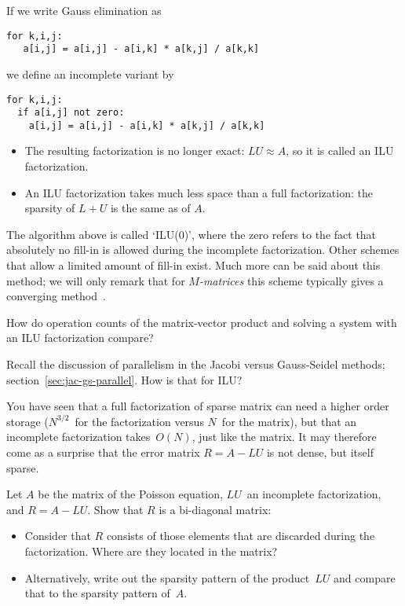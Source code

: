 If we write Gauss elimination as
\begin{verbatim}
for k,i,j:
   a[i,j] = a[i,j] - a[i,k] * a[k,j] / a[k,k]
\end{verbatim}
we define an incomplete variant by
\begin{verbatim}
for k,i,j:
  if a[i,j] not zero:
    a[i,j] = a[i,j] - a[i,k] * a[k,j] / a[k,k]
\end{verbatim}
\begin{itemize}
\item The resulting factorization is no longer exact: $LU\approx A$,
  so it is called an \acf{ILU} factorization.
\item An \ac{ILU} factorization takes much less space than a full
  factorization: the sparsity of $L+U$ is the same as of $A$.
\end{itemize}
The algorithm above is called `ILU(0)', where the zero refers to the
fact that absolutely no fill-in is allowed during the incomplete
factorization.  Other schemes that allow a limited amount of fill-in
exist.  Much more can be said about this method; we will only remark
that for \emph{$M$-matrices}
this scheme typically gives a converging
method~\cite{MevdVo:itsol}.

\begin{exercise}
  How do operation counts of the matrix-vector product and solving a
  system with an \ac{ILU} factorization compare?

  Recall the discussion of parallelism in the Jacobi versus Gauss-Seidel methods;
  section~\ref{sec:jac-gs-parallel}.
  How is that for \ac{ILU}?
\end{exercise}

You have seen that a full factorization of sparse matrix can need a
higher order storage ($N^{3/2}$~for the factorization versus $N$~for
the matrix), but that an incomplete factorization takes~$O(N)$, just
like the matrix. It may therefore come as a surprise that the error
matrix $R=A-LU$ is not dense, but itself sparse.
\begin{exercise}
  Let $A$ be the matrix of the Poisson equation, $LU$~an incomplete
  factorization, and $R=A-LU$. Show that $R$ is a bi-diagonal matrix:
  \begin{itemize}
  \item Consider that $R$ consists of those elements that are
    discarded during the factorization. Where are they located in the
    matrix?
  \item Alternatively, write out the sparsity pattern of the
    product~$LU$ and compare that to the sparsity pattern of~$A$.
  \end{itemize}
\end{exercise}

